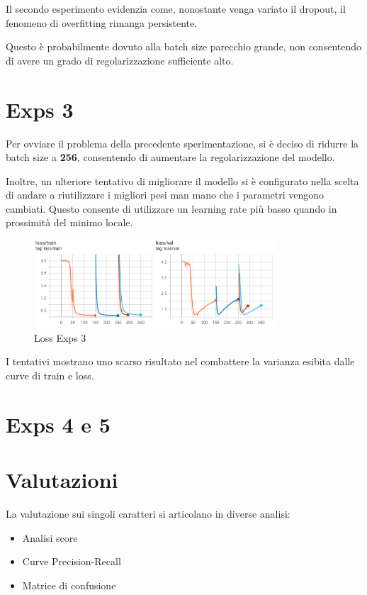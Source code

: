 Il secondo esperimento evidenzia come, nonostante venga variato il dropout, il fenomeno di overfitting rimanga persistente.

Questo è probabilmente dovuto alla batch size parecchio grande, non consentendo di avere un grado di regolarizzazione sufficiente alto.


\section{Exps 3}

Per ovviare il problema della precedente sperimentazione, si è deciso di ridurre la batch size a \textbf{256}, consentendo di aumentare la regolarizzazione del modello.

Inoltre, un ulteriore tentativo di migliorare il modello si è configurato nella scelta di andare a riutilizzare i migliori pesi man mano che i parametri vengono cambiati. Questo consente di utilizzare un learning rate più basso quando in prossimità del minimo locale.

\begin{figure}[htbp]
    \centering
    \includegraphics[width=0.8\textwidth]{images/exps3_loss.png}
    \caption{Loss Exps 3}
    \label{fig:exps1_loss}
\end{figure}

I tentativi mostrano uno scarso risultato nel combattere la varianza esibita dalle curve di train e loss.


\section{Exps 4 e 5}



\section{Valutazioni}
La valutazione sui singoli caratteri si articolano in diverse analisi:
\begin{itemize}
    \item Analisi score
    \item Curve Precision-Recall
    \item Matrice di confusione
\end{itemize}

